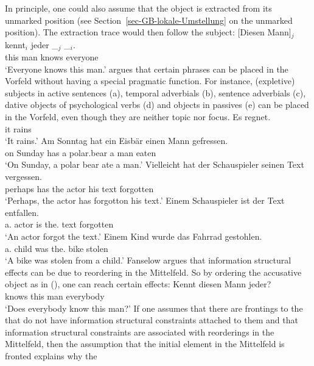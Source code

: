 In principle, one could also assume that the object is extracted from its unmarked position (see
Section~\ref{sec-GB-lokale-Umstellung} on the unmarked position). The extraction trace would then
follow the subject:
\ea
\label{Beispiel-Diesen-Mann-kent-jeder-trace-follows-subjectHPSG}
\gll {}[Diesen Mann]$_j$ kennt$_i$ jeder \_$_j$  \_$_i$.\\
	 {}\spacebr{}this man knows everyone {}\\
\glt `Everyone knows this man.'
\z
\citet{Fanselow2004c} argues that certain phrases can be placed in the Vorfeld without having a
special pragmatic function. For instance, (expletive) subjects in active sentences (a),
temporal adverbials (b), sentence adverbials (c), dative objects of psychological verbs (d) and objects in
passives (e) can be placed in the Vorfeld, even though they are neither topic nor focus.
\eal
\ex
\gll Es regnet.\\
     it rains\\
\glt `It rains.'
\ex 
\gll Am Sonntag hat ein Eisbär einen Mann gefressen.\\
     on Sunday  has a   polar.bear a man eaten\\
\glt `On Sunday, a polar bear ate a man.'
\ex 
\gll Vielleicht hat der Schauspieler seinen Text vergessen.\\
     perhaps    has the actor his text forgotten\\
\glt `Perhaps, the actor has forgotton his text.'
\ex 
\gll Einem Schauspieler ist der Text entfallen.\\
     a.\dat{} actor is the.\nom{} text forgotten\\
\glt `An actor forgot the text.'
\ex
\gll Einem Kind wurde das Fahrrad gestohlen.\\
     a.\dat{} child was the.\nom{} bike stolen\\
\glt `A bike was stolen from a child.'
\zl
Fanselow argues that information structural effects can be due to reordering in the Mittelfeld. So
by ordering the accusative object as in (), one can reach certain effects:
\ea
\gll Kennt diesen Mann jeder?\\
     knows this man everybody\\
\glt `Does everybody know this man?'
\z
If one assumes that there are frontings to the \vf that do not have information structural constraints
attached to them and that information structural constraints are associated with reorderings in the
Mittelfeld, then the assumption that the initial element in the Mittelfeld is fronted explains why the
